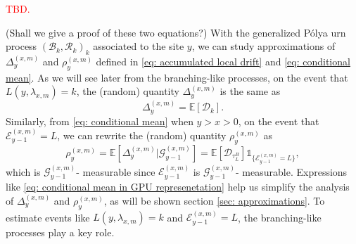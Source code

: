 \documentclass[twoside,12pt,a4paper]{article}
\numberwithin{equation}{section}
\newcommand\TBD{\textcolor{red}{TBD.}}
\begin{document}
\TBD{(Shall we give a proof of these two equations?) With the generalized P\'{o}lya urn process $(\mathcal{B}_k,\mathcal{R}_k )_k$ associated to the site $y$, we can study approximations of $\Delta_{y}^{(x,m)}$ and $\rho_{y}^{(x,m)}$ defined in \eqref{eq: accumulated local drift} and \eqref{eq: conditional mean}. As we will see later from the branching-like processes, on the event that $ L(y,\lambda_{x,m}) = k$,  the (random) quantity $\Delta_{y}^{(x,m)}$ is the same as
$$
\Delta_{y}^{(x,m)} = \mathbb{E}\left[ \mathcal{D}_k \right].
$$ 
Similarly, from \eqref{eq: conditional mean} when $y> x >0$, on the event that $ \mathcal{E}^{(x,m)}_{y-1} = L $, we can rewrite the (random) quantity $ \rho_{y}^{(x,m)} $ as
\begin{equation}\label{eq: conditional mean in GPU represenetation}
	\rho_{y}^{(x,m)} = \mathbb{E}\left[\Delta_{y}^{(x,m)} \vert \mathcal{G}_{y-1}^{(x,m)}\right] = \mathbb{E}\left[ \mathcal{D}_{\tau^B_L}  \right]\mathbb{1}_{\{  \mathcal{E}^{(x,m)}_{y-1} = L \}},
\end{equation} which is $\mathcal{G}_{y-1}^{(x,m)}$- measurable since $\mathcal{E}^{(x,m)}_{y-1} $ is $\mathcal{G}_{y-1}^{(x,m)}$- measurable. Expressions like \eqref{eq: conditional mean in GPU represenetation} help us simplify the analysis of $\Delta_{y}^{(x,m)}$ and $\rho_{y}^{(x,m)}$, as will be shown section \ref{sec: approximations}. To estimate events like $ L(y,\lambda_{x,m}) = k$ and $\mathcal{E}^{(x,m)}_{y-1} = L $, the branching-like processes play a key role. 


}
\end{document}

